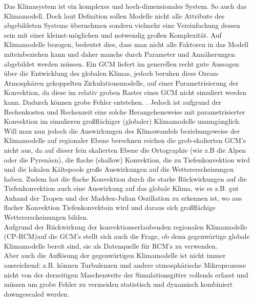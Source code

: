 Das Klimasystem ist ein komplexes und hoch-dimensionales System. So auch das Klimamodell. Doch laut Definition \cite[vgl.][]{stachowiak} sollen Modelle nicht alle Attribute des abgebildeten Systems übernehmen sondern vielmehr eine Vereinfachung dessen sein mit einer kleinst-möglichen und notwendig großen Komplexität. Auf Klimamodelle bezogen, bedeutet dies, dass man nicht alle Faktoren in das Modell miteinbeziehen kann und daher manche durch Parameter und Annäherungen abgebildet werden müssen. Ein GCM liefert im generellen recht gute Aussagen über die Entwicklung des globalen Klimas, jedoch beruhen diese Ozean-Atmosphären gekoppelten Zirkulationsmodelle, auf einer Parametrisierung der Konvektion, da diese im relativ groben Raster eines GCM nicht simuliert werden kann. Dadurch können grobe Fehler entstehen. \cite[vgl.][Stevens \& Bony]{stevensbony}. Jedoch ist aufgrund der Rechenkosten und Rechenzeit eine solche Herangehensweise mit parametrisierter Konvektion im simulieren großflächiger (globaler) Klimamodelle  unumgänglich.\\
Will man nun jedoch die Auswirkungen des Klimawandels beziehungsweise der Klimamodelle auf regionaler Ebene berechnen reichen die grob-skalierten GCM's nicht aus, da auf dieser fein skalierten Ebene die Ortographie (wie z.B die Alpen oder die Pyrenäen), die flache (shallow) Konvektion, die zu Tiefenkonvektion wird und die lokalen Kältepools große Auswirkungen auf die Wettererscheinungen haben. Zudem hat die flache Konvektion durch die starke Rückwirkungen auf die Tiefenkonvektion auch eine Auswirkung auf das globale Klima, wie es z.B. gut Anhand der Tropen \cite[vgl.][Teixeara et al.]{teixeracardoso} und der Madden-Julian Oszillation\cite[vgl.][Chen S. et al.]{chenshuyi} zu erkennen ist, wo aus flacher Konvektion Tiefenkonvektoin wird und daraus sich großflächige Wettererscheinungen bilden.\\
Aufgrund der Rückwirkung der konvektionserlaubenden regionalen Klimamodelle (CP-RCM)auf die GCM's stellt sich auch die Frage, ob denn gegenwärtige globale Klimamodelle bereit sind, sie als Datenquelle für RCM's zu verwenden.\\
Aber auch die Auflösung der gegenwärtigen Klimamodelle ist nicht immer ausreichend: z.B. können Turbulenzen und andere atmosphärische Mikroprozesse nicht von der derzeitigen Maschenweite der Simulationsgitter vollends erfasst und müssen um grobe Fehler zu vermeiden statistisch und dynamisch kombiniert downgescaled werden. \cite[vgl.][Maraun et al.]{marauntowards}\\



